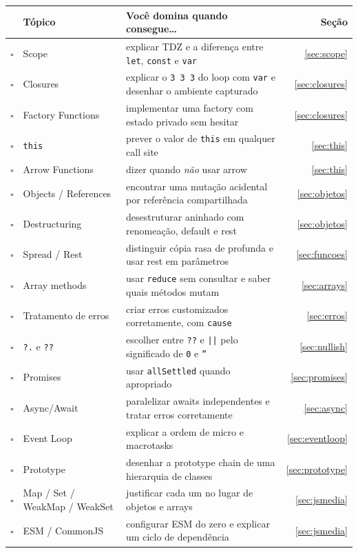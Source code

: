 \documentclass[12pt,a4paper,oneside]{book}
\newcommand{\code}[1]{\texttt{#1}}
\newcommand{\cb}{$\square$}
\begin{document}
{\small
\begin{tabularx}{\textwidth}{@{}clXr@{}}
\toprule
 & \textbf{Tópico} & \textbf{Você domina quando consegue\ldots} & \textbf{Seção} \\
\midrule
\cb & Scope & explicar TDZ e a diferença entre \code{let}, \code{const} e \code{var} & \ref{sec:scope} \\
\cb & Closures & explicar o \code{3 3 3} do loop com \code{var} e desenhar o ambiente capturado & \ref{sec:closures} \\
\cb & Factory Functions & implementar uma factory com estado privado sem hesitar & \ref{sec:closures} \\
\cb & \code{this} & prever o valor de \code{this} em qualquer call site & \ref{sec:this} \\
\cb & Arrow Functions & dizer quando \emph{não} usar arrow & \ref{sec:this} \\
\cb & Objects / References & encontrar uma mutação acidental por referência compartilhada & \ref{sec:objetos} \\
\cb & Destructuring & desestruturar aninhado com renomeação, default e rest & \ref{sec:objetos} \\
\cb & Spread / Rest & distinguir cópia rasa de profunda e usar rest em parâmetros & \ref{sec:funcoes} \\
\cb & Array methods & usar \code{reduce} sem consultar e saber quais métodos mutam & \ref{sec:arrays} \\
\cb & Tratamento de erros & criar erros customizados corretamente, com \code{cause} & \ref{sec:erros} \\
\cb & \code{?.} e \code{??} & escolher entre \code{??} e \code{||} pelo significado de \code{0} e \code{''} & \ref{sec:nullish} \\
\cb & Promises & usar \code{allSettled} quando apropriado & \ref{sec:promises} \\
\cb & Async/Await & paralelizar awaits independentes e tratar erros corretamente & \ref{sec:async} \\
\cb & Event Loop & explicar a ordem de micro e macrotasks & \ref{sec:eventloop} \\
\cb & Prototype & desenhar a prototype chain de uma hierarquia de classes & \ref{sec:prototype} \\
\cb & Map / Set / WeakMap / WeakSet & justificar cada um no lugar de objetos e arrays & \ref{sec:jsmedia} \\
\cb & ESM / CommonJS & configurar ESM do zero e explicar um ciclo de dependência & \ref{sec:jsmedia} \\
\bottomrule
\end{tabularx}
}
\end{document}
